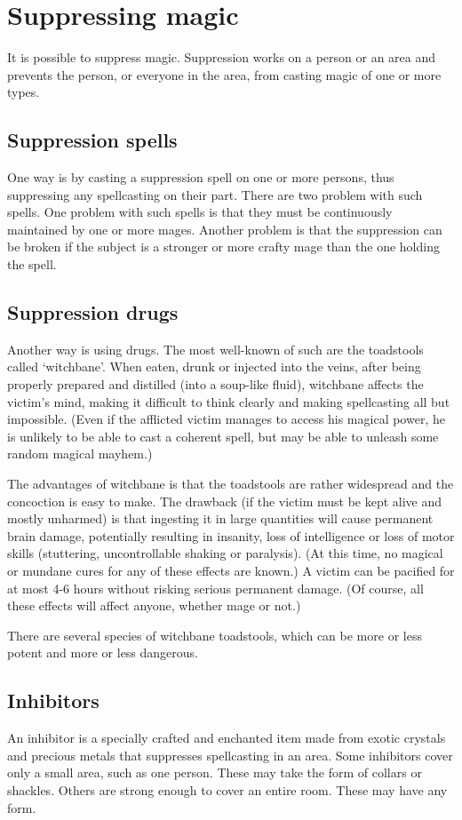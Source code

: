 \section{Suppressing magic}
It is possible to suppress magic. Suppression works on a person or an area and prevents the person, or everyone in the area, from casting magic of one or more types. 

\subsection{Suppression spells}
One way is by casting a suppression spell on one or more persons, thus suppressing any spellcasting on their part. There are two problem with such spells. One problem with such spells is that they must be continuously maintained by one or more mages. Another problem is that the suppression can be broken if the subject is a stronger or more crafty mage than the one holding the spell. 

\subsection{Suppression drugs}
Another way is using drugs. The most well-known of such are the toadstools called `witchbane'. When eaten, drunk or injected into the veins, after being properly prepared and distilled (into a soup-like fluid), witchbane affects the victim's mind, making it difficult to think clearly and making spellcasting all but impossible. (Even if the afflicted victim manages to access his magical power, he is unlikely to be able to cast a coherent spell, but may be able to unleash some random magical mayhem.) 

The advantages of witchbane is that the toadstools are rather widespread and the concoction is easy to make. The drawback (if the victim must be kept alive and mostly unharmed) is that ingesting it in large quantities will cause permanent brain damage, potentially resulting in insanity, loss of intelligence or loss of motor skills (stuttering, uncontrollable shaking or paralysis). (At this time, no magical or mundane cures for any of these effects are known.) A victim can be pacified for at most 4-6 hours without risking serious permanent damage. (Of course, all these effects will affect anyone, whether mage or not.)

There are several species of witchbane toadstools, which can be more or less potent and more or less dangerous. 

\subsection{Inhibitors}
An inhibitor is a specially crafted and enchanted item made from exotic crystals and precious metals that suppresses spellcasting in an area. Some inhibitors cover only a small area, such as one person. These may take the form of collars or shackles. Others are strong enough to cover an entire room. These may have any form. 

